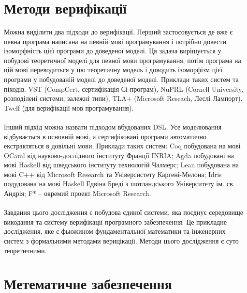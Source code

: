 \documentclass[9pt]{memoir}
\begin{document}
\newpage
\section{Методи верифікації}

    \paragraph{}
    Можна виділити два підходи до верифікації. Перший застосовується де вже є
    певна програма написана на певній мові програмування і потрібно довести ізоморфність
    цієї програми до доведеної моделі. Ця задача вирішується у побудові теоретичної моделі
    для певної мови програмування, потім програма на цій мові переводиться у цю
    теоретичну модель і доводить ізоморфізм цієї програми у побудованій моделі до доведеної моделі.
    Приклади таких систем та піходів. VST (CompCert, сертифікація Сі-програм),
    NuPRL (Cornell University, розподілені системи, залежні типи),
    TLA+ (Microsoft Reseach, Леслі Лампорт), Twelf (для верифікації мов програмування).

    \paragraph{}
    Інший підхід можна назвати підходом вбудованих DSL. Усе моделювання відбувається
    в основній мові, а сертифіковані програми автоматично екстрактяться в довільні мови.
    Приклади таких систем: Coq побудована на мові OCaml від науково-дослідного
    інституту Франції INRIA; Agda побудовані на мові Haskell від шведського інституту технологій Чалмерс;
    Lean побудована на мові C++ від Microsoft Research та Універсистету Каргені-Мелона;
    Idris подудована на мові Haskell Едвіна Бреді з шотландського Університету ім. св. Андрія;
    F* -- окремий проект Microsoft Research.

    \paragraph{}
    Завдання цього дослідження є побудова єдиної системи, яка поєднує середовище
    викодання та систему верифікації програмного забезпечення. Це прикладне дослідження,
    яке є фьюжином фундаментальної математики та інженерних систем з формальними методами верицікації.
    Методи цього дослідження є суто теоретичними.

\newpage
\section{Метематичне забезпечення}
\vspace{0.3cm}
\end{document}
